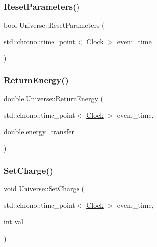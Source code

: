 \mbox{\label{classUniverse_a1d92b2277564577571c802f6e0c206dd}} 
\subsubsection{\texorpdfstring{Reset\+Parameters()}{ResetParameters()}}
{\footnotesize\ttfamily bool Universe\+::\+Reset\+Parameters (\begin{DoxyParamCaption}\item[{std\+::chrono\+::time\+\_\+point$<$ \mbox{\hyperlink{universe_8h_a0ef8d951d1ca5ab3cfaf7ab4c7a6fd80}{Clock}} $>$}]{event\+\_\+time }\end{DoxyParamCaption})}

\mbox{\label{classUniverse_aeda74e3902c0e56c0c09779854045cde}} 
\subsubsection{\texorpdfstring{Return\+Energy()}{ReturnEnergy()}}
{\footnotesize\ttfamily double Universe\+::\+Return\+Energy (\begin{DoxyParamCaption}\item[{std\+::chrono\+::time\+\_\+point$<$ \mbox{\hyperlink{universe_8h_a0ef8d951d1ca5ab3cfaf7ab4c7a6fd80}{Clock}} $>$}]{event\+\_\+time,  }\item[{double}]{energy\+\_\+transfer }\end{DoxyParamCaption})}

\mbox{\label{classUniverse_a3b3da7c86a7b75e5e5c0b7972ac82a87}} 
\subsubsection{\texorpdfstring{Set\+Charge()}{SetCharge()}}
{\footnotesize\ttfamily void Universe\+::\+Set\+Charge (\begin{DoxyParamCaption}\item[{std\+::chrono\+::time\+\_\+point$<$ \mbox{\hyperlink{universe_8h_a0ef8d951d1ca5ab3cfaf7ab4c7a6fd80}{Clock}} $>$}]{event\+\_\+time,  }\item[{int}]{val }\end{DoxyParamCaption})\hspace{0.3cm}{\ttfamily [virtual]}}



